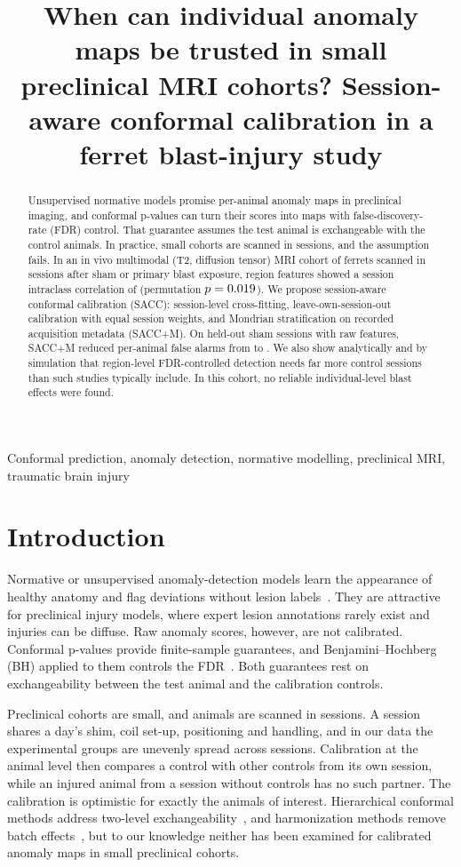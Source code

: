 \documentclass{article}
\title{When can individual anomaly maps be trusted in small preclinical MRI cohorts? Session-aware conformal calibration in a ferret blast-injury study}
\begin{document}
\maketitle

\begin{abstract}
Unsupervised normative models promise per-animal anomaly maps in preclinical imaging, and conformal p-values can turn their scores into maps with false-discovery-rate (FDR) control. That guarantee assumes the test animal is exchangeable with the control animals. In practice, small cohorts are scanned in sessions, and the assumption fails. In an in vivo multimodal (T2, diffusion tensor) MRI cohort of \Nanimals{} ferrets scanned in \Nsessions{} sessions after sham or primary blast exposure, region features showed a session intraclass correlation of \ICC{} (permutation $p=0.019$). We propose session-aware conformal calibration (SACC): session-level cross-fitting, leave-own-session-out calibration with equal session weights, and Mondrian stratification on recorded acquisition metadata (SACC+M). On held-out sham sessions with raw features, SACC+M reduced per-animal false alarms from \FAnaive{} to \FAsaccm{}. We also show analytically and by simulation that region-level FDR-controlled detection needs far more control sessions than such studies typically include. In this cohort, no reliable individual-level blast effects were found.
\end{abstract}

\begin{keywords}
Conformal prediction, anomaly detection, normative modelling, preclinical MRI, traumatic brain injury
\end{keywords}

\section{Introduction}
\label{sec:intro}
Normative or unsupervised anomaly-detection models learn the appearance of healthy anatomy and flag deviations without lesion labels~\cite{baur2021,marquand2016}. They are attractive for preclinical injury models, where expert lesion annotations rarely exist and injuries can be diffuse. Raw anomaly scores, however, are not calibrated. Conformal p-values provide finite-sample guarantees, and Benjamini--Hochberg (BH) applied to them controls the FDR~\cite{bates2023,bh1995}. Both guarantees rest on exchangeability between the test animal and the calibration controls.

Preclinical cohorts are small, and animals are scanned in sessions. A session shares a day's shim, coil set-up, positioning and handling, and in our data the experimental groups are unevenly spread across sessions. Calibration at the animal level then compares a control with other controls from its own session, while an injured animal from a session without controls has no such partner. The calibration is optimistic for exactly the animals of interest. Hierarchical conformal methods address two-level exchangeability~\cite{dunn2023}, and harmonization methods remove batch effects~\cite{fortin2017}, but to our knowledge neither has been examined for calibrated anomaly maps in small preclinical cohorts.
\end{document}
